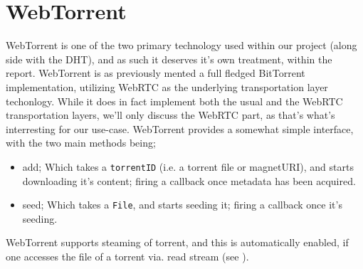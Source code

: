 \section{WebTorrent}
WebTorrent is one of the two primary technology used within our project (along 
side with the \acs{DHT}), and as such it deserves it's own treatment, within the 
report.
\newline\newline
WebTorrent is as previously mented a full fledged BitTorrent implementation, 
utilizing WebRTC as the underlying transportation layer techonlogy. While it 
does in fact implement both the usual and the WebRTC transportation layers,
we'll only discuss the WebRTC part, as that's what's interresting for our
use-case.
\newline
WebTorrent provides a somewhat simple interface, with the two main methods being;
\begin{itemize}
    \item add; Which takes a \verb|torrentID| (i.e. a torrent file or magnetURI),
        and starts downloading it's content; firing a callback once metadata has
        been acquired.
    \item seed; Which takes a \verb|File|, and starts seeding it; firing a
        callback once it's seeding.
\end{itemize}
WebTorrent supports steaming of torrent, and this is automatically enabled, if 
one accesses the file of a torrent via. read stream (see \citep{WebTorrent:api}).
